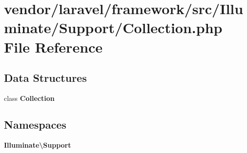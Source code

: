 \section{vendor/laravel/framework/src/\+Illuminate/\+Support/\+Collection.php File Reference}
\label{laravel_2framework_2src_2_illuminate_2_support_2_collection_8php}
\subsection*{Data Structures}
\begin{DoxyCompactItemize}
\item 
class {\bf Collection}
\end{DoxyCompactItemize}
\subsection*{Namespaces}
\begin{DoxyCompactItemize}
\item 
 {\bf Illuminate\textbackslash{}\+Support}
\end{DoxyCompactItemize}
